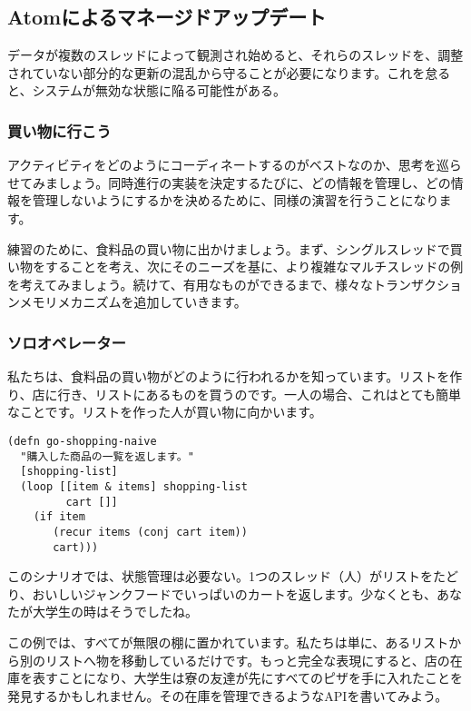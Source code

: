 \subsection{Atomによるマネージドアップデート}

データが複数のスレッドによって観測され始めると、それらのスレッドを、調整されていない部分的な更新の混乱から守ることが必要になります。これを怠ると、システムが無効な状態に陥る可能性がある。



\subsubsection{買い物に行こう}

アクティビティをどのようにコーディネートするのがベストなのか、思考を巡らせてみましょう。同時進行の実装を決定するたびに、どの情報を管理し、どの情報を管理しないようにするかを決めるために、同様の演習を行うことになります。

練習のために、食料品の買い物に出かけましょう。まず、シングルスレッドで買い物をすることを考え、次にそのニーズを基に、より複雑なマルチスレッドの例を考えてみましょう。続けて、有用なものができるまで、様々なトランザクションメモリメカニズムを追加していきます。

\subsubsection{ソロオペレーター}

私たちは、食料品の買い物がどのように行われるかを知っています。リストを作り、店に行き、リストにあるものを買うのです。一人の場合、これはとても簡単なことです。リストを作った人が買い物に向かいます。


\begin{lstlisting}[numbers=none]
(defn go-shopping-naive
  "購入した商品の一覧を返します。"
  [shopping-list]
  (loop [[item & items] shopping-list
         cart []]
    (if item
       (recur items (conj cart item))
       cart)))
\end{lstlisting}


このシナリオでは、状態管理は必要ない。1つのスレッド（人）がリストをたどり、おいしいジャンクフードでいっぱいのカートを返します。少なくとも、あなたが大学生の時はそうでしたね。

この例では、すべてが無限の棚に置かれています。私たちは単に、あるリストから別のリストへ物を移動しているだけです。もっと完全な表現にすると、店の在庫を表すことになり、大学生は寮の友達が先にすべてのピザを手に入れたことを発見するかもしれません。その在庫を管理できるようなAPIを書いてみよう。


